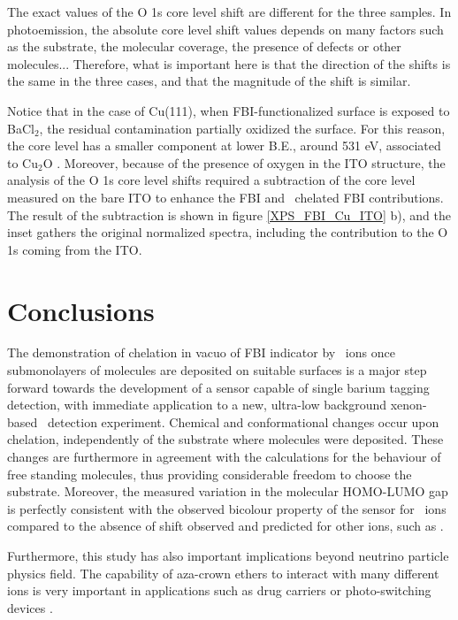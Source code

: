 \documentclass[aps,prl,reprint,longbibliography,superscriptaddress, english]{revtex4-1}
\def\BappCl{BaCl$_2$}
\begin{document}
The exact values of the O 1s core level shift are different for the three samples. In photoemission, the absolute core level shift values depends on many factors such as the substrate, the molecular coverage, the presence of defects or other molecules... Therefore, what is important here is that the direction of the shifts is the same in the three cases, and that the magnitude of the shift is similar. 

Notice that in the case of Cu(111), when FBI-functionalized surface is exposed to \BappCl, the residual contamination partially oxidized the surface. For this reason, the core level has a smaller component at lower B.E., around 531 eV, associated to  Cu$_2$O \cite{zhu_surface_2013}. Moreover, because of the presence of oxygen in the ITO structure, the analysis of the O 1s core level shifts required a subtraction of the core level measured on the bare ITO to enhance the FBI and \Bapp\ chelated FBI contributions. The result of the subtraction is shown in figure \ref{XPS_FBI_Cu_ITO} b), and the inset gathers the original normalized spectra, including the contribution to the  O 1s coming from the ITO.  


\section{Conclusions}
The demonstration of chelation in vacuo of FBI indicator by \Bapp\ ions once submonolayers of molecules are deposited on suitable surfaces is a major step forward towards the development of a sensor capable of single barium tagging detection, with immediate application to a new, ultra-low background xenon-based \bbonu\ detection experiment. Chemical and conformational changes occur upon chelation, independently of the substrate where molecules were deposited. These changes are furthermore in agreement with the calculations for the behaviour of free standing molecules, thus providing considerable freedom to choose the substrate. Moreover, the measured variation in the molecular HOMO-LUMO gap is perfectly consistent with the observed bicolour property of the sensor for \Bapp\ ions compared to the absence of shift observed and predicted for other ions, such as \Nap.  

Furthermore, this study has also important implications beyond neutrino particle physics field. The capability of {aza-crown ethers} to interact with many different ions is very important in applications such as drug carriers \cite{uchegbu_non-ionic_1998} or photo-switching devices \cite{malval_photoswitching_2002,uda_membrane_2005}. 
\end{document}
